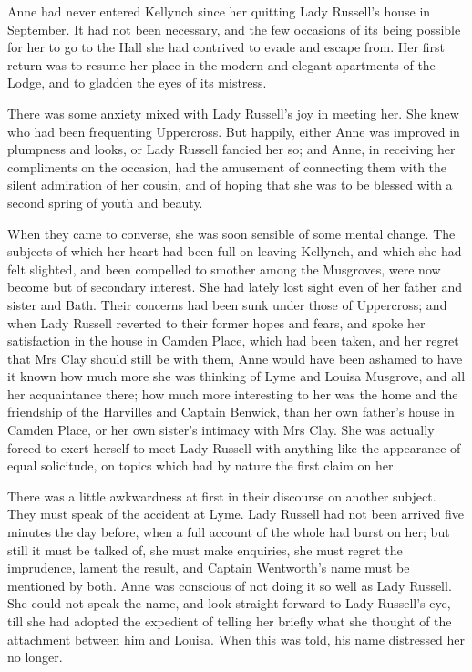 Anne had never entered Kellynch since her quitting Lady Russell's house in September. It had not been necessary, and the few occasions of its being possible for her to go to the Hall she had contrived to evade and escape from. Her first return was to resume her place in the modern and elegant apartments of the Lodge, and to gladden the eyes of its mistress.

There was some anxiety mixed with Lady Russell's joy in meeting her. She knew who had been frequenting Uppercross. But happily, either Anne was improved in plumpness and looks, or Lady Russell fancied her so; and Anne, in receiving her compliments on the occasion, had the amusement of connecting them with the silent admiration of her cousin, and of hoping that she was to be blessed with a second spring of youth and beauty.

When they came to converse, she was soon sensible of some mental change. The subjects of which her heart had been full on leaving Kellynch, and which she had felt slighted, and been compelled to smother among the Musgroves, were now become but of secondary interest. She had lately lost sight even of her father and sister and Bath. Their concerns had been sunk under those of Uppercross; and when Lady Russell reverted to their former hopes and fears, and spoke her satisfaction in the house in Camden Place, which had been taken, and her regret that Mrs Clay should still be with them, Anne would have been ashamed to have it known how much more she was thinking of Lyme and Louisa Musgrove, and all her acquaintance there; how much more interesting to her was the home and the friendship of the Harvilles and Captain Benwick, than her own father's house in Camden Place, or her own sister's intimacy with Mrs Clay. She was actually forced to exert herself to meet Lady Russell with anything like the appearance of equal solicitude, on topics which had by nature the first claim on her.

There was a little awkwardness at first in their discourse on another subject. They must speak of the accident at Lyme. Lady Russell had not been arrived five minutes the day before, when a full account of the whole had burst on her; but still it must be talked of, she must make enquiries, she must regret the imprudence, lament the result, and Captain Wentworth's name must be mentioned by both. Anne was conscious of not doing it so well as Lady Russell. She could not speak the name, and look straight forward to Lady Russell's eye, till she had adopted the expedient of telling her briefly what she thought of the attachment between him and Louisa. When this was told, his name distressed her no longer.

